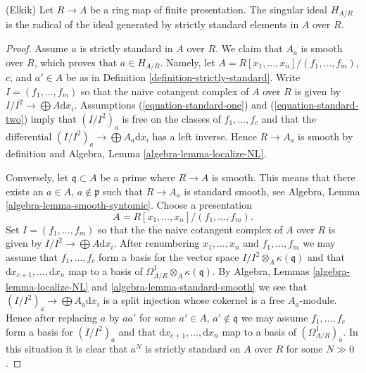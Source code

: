\begin{lemma}
\label{lemma-elkik}
(Elkik) Let $R \to A$ be a ring map of finite presentation.
The singular ideal $H_{A/R}$ is the radical of the ideal
generated by strictly standard elements in $A$ over $R$.
\end{lemma}

\begin{proof}
Assume $a$ is strictly standard in $A$ over $R$. We claim that
$A_a$ is smooth over $R$, which proves that $a \in H_{A/R}$. Namely,
let $A = R[x_1, \ldots, x_n]/(f_1, \ldots, f_m)$, $c$, and $a' \in A$
be as in Definition \ref{definition-strictly-standard}.
Write $I = (f_1, \ldots, f_m)$ so that the naive cotangent
complex of $A$ over $R$ is given by $I/I^2 \to \bigoplus A\text{d}x_i$.
Assumptions (\ref{equation-standard-one}) and (\ref{equation-standard-two})
imply that $(I/I^2)_a$ is free on the classes of $f_1, \ldots, f_c$  
and that the differential $(I/I^2)_a \to \bigoplus A_a\text{d}x_i$
has a left inverse. Hence $R \to A_a$ is smooth by definition and
Algebra, Lemma \ref{algebra-lemma-localize-NL}.

\medskip\noindent
Conversely, let $\mathfrak q \subset A$ be a prime where $R \to A$
is smooth. This means that there exists an $a \in A$, $a \not \in \mathfrak p$
such that $R \to A_a$ is standard smooth, see
Algebra, Lemma \ref{algebra-lemma-smooth-syntomic}.
Choose a presentation
$$
A = R[x_1, \ldots, x_n]/(f_1, \ldots, f_m).
$$
Set $I = (f_1, \ldots, f_m)$ so that the the naive cotangent
complex of $A$ over $R$ is given by $I/I^2 \to \bigoplus A\text{d}x_i$.
After renumbering $x_1, \ldots, x_n$ and $f_1, \ldots, f_m$ we may assume
that $f_1, \ldots, f_c$ form a basis for the vector space
$I/I^2 \otimes_A \kappa(\mathfrak q)$ and that
$\text{d}x_{c + 1}, \ldots, \text{d}x_n$ map to a basis of
$\Omega^1_{A/R} \otimes_A \kappa(\mathfrak q)$.
By
Algebra, Lemmas \ref{algebra-lemma-localize-NL} and
\ref{algebra-lemma-standard-smooth}
we see that $(I/I^2)_a \to \bigoplus A_a\text{d}x_i$ is a split injection
whose cokernel is a free $A_a$-module. Hence after replacing $a$ by $aa'$ for
some $a' \in A$, $a' \not \in \mathfrak q$ we may assume
$f_1, \ldots, f_c$ form a basis for $(I/I^2)_a$ and that
$\text{d}x_{c + 1}, \ldots, \text{d}x_n$ map to a basis of
$(\Omega^1_{A/R})_a$. In this situation it is clear that
$a^N$ is strictly standard on $A$ over $R$ for some $N \gg 0$.
\end{proof}






